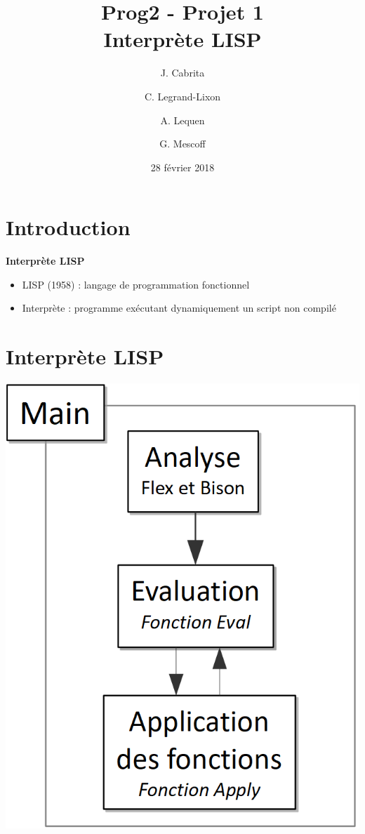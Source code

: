 \documentclass[info]{ensrennesbeamer}
\author{J. Cabrita\and C. Legrand-Lixon\and A. Lequen\and G. Mescoff}
\title{Prog2 - Projet 1 \\ Interprète LISP}
\institute[]{ENS Rennes}
\date{28 février 2018}
\begin{document}
{
\begin{frame}[plain]
\titlepage
\end{frame}
}

\section*{Introduction}
\begin{frame}
\textbf{Interprète LISP}
	\begin{itemize}
		\item LISP (1958) : langage de programmation fonctionnel
		\item Interprète : programme exécutant dynamiquement un script non compilé	
	\end{itemize}
\end{frame}

\begin{frame}
\tableofcontents
\end{frame}

\section{Interprète LISP}
\begin{frame}
\centering
	\includegraphics[height=0.8\textheight]{schema_fonctionnement.png}
\end{frame}
\end{document}
